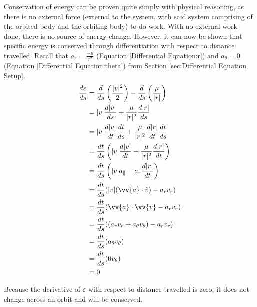 \documentclass[../basicOrbitalDynamics.tex]{subfiles}
\begin{document}
Conservation of energy can be proven quite simply with physical reasoning, as there is no external force (external to the system, with said system comprising of the orbited body and the orbiting body) to do work. With no external work done, there is no source of energy change. However, it can now be shown that specific energy is conserved through differentiation with respect to distance travelled. Recall that $a_r=\frac{-\mu}{r^2}$ (Equation \eqref{Differential Equation:r}) and $a_\theta=0$ (Equation \eqref{Differential Equation:theta}) from Section \ref{sec:Differential Equation Setup}.
\begin{align*}
    \frac{d\varepsilon}{ds} & =\frac{d}{ds}\left(\frac{|v|^2}{2}\right)-\frac{d}{ds}\left(\frac{\mu}{|r|}\right) \\
                            & =|v|\frac{d|v|}{ds}+\frac{\mu{}}{|r|^2}\frac{d|r|}{ds}                             \\
                            & =|v|\frac{d|v|}{dt}\frac{dt}{ds}+\frac{\mu{}}{|r|^2}\frac{d|r|}{dt}\frac{dt}{ds}   \\
                            & =\frac{dt}{ds}\left(|v|\frac{d|v|}{dt}+\frac{\mu{}}{|r|^2}\frac{d|r|}{dt}\right)   \\
                            & =\frac{dt}{ds}\left(|v|a_\parallel-a_r\frac{d|r|}{dt}\right)                       \\
                            & =\frac{dt}{ds}(|v|(\vv{a}\cdot\hat{v})-a_rv_r)                                     \\
                            & =\frac{dt}{ds}(\vv{a}\cdot\vv{v}-a_rv_r)                                           \\
                            & =\frac{dt}{ds}((a_rv_r+a_\theta{}v_\theta)-a_rv_r)                                 \\
                            & =\frac{dt}{ds}(a_\theta{}v_\theta)                                                 \\
                            & =\frac{dt}{ds}(0v_\theta)                                                          \\
                            & =0                                                                                 \\
\end{align*}

Because the derivative of $\varepsilon$ with respect to distance travelled is zero, it does not change across an orbit and will be conserved.
\end{document}
